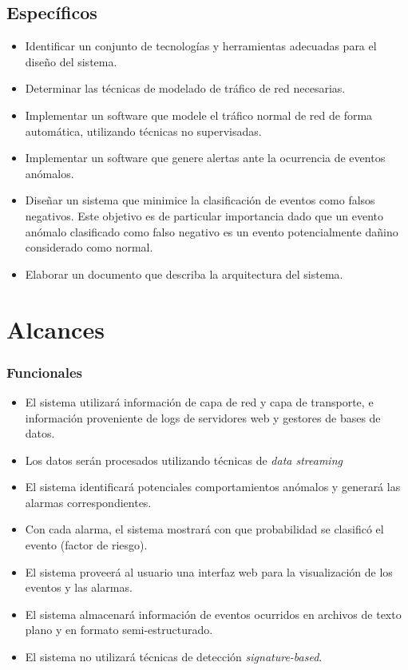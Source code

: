 \subsection*{Específicos}
\begin{itemize}

\item Identificar un conjunto de tecnologías y herramientas adecuadas para el diseño del sistema.
\item Determinar las técnicas de modelado de tráfico de red necesarias.
\item Implementar un software que modele el tráfico normal de red de forma automática, utilizando técnicas no supervisadas.
\item Implementar un software que genere alertas ante la ocurrencia de eventos anómalos.
\item Diseñar un sistema que minimice la clasificación de eventos como falsos negativos. Este objetivo es de particular importancia dado que un evento anómalo clasificado como falso negativo es un evento potencialmente dañino considerado como normal.
\item Elaborar un documento que describa la arquitectura del sistema.
\end{itemize}

\section*{Alcances}

\subsubsection*{Funcionales}
\begin{itemize}
	\item El sistema utilizará información de capa de red\cite{rfc791} y capa de transporte\cite{rfc793}\cite{rfc1180}, e información proveniente de logs de servidores web y gestores de bases de datos.
	\item Los datos serán procesados utilizando técnicas de \textit{data streaming}\cite{Fischer:2012:RVA:2245276.2245432}
	\item El sistema identificará potenciales comportamientos anómalos y generará las alarmas correspondientes.
	\item Con cada alarma, el sistema mostrará con que probabilidad se clasificó el evento (factor de riesgo).
	\item El sistema proveerá al usuario una interfaz web para la visualización de los eventos y las alarmas.
	\item El sistema almacenará información de eventos ocurridos en archivos de texto plano y en formato semi-estructurado.
	\item El sistema no utilizará técnicas de detección \textit{signature-based}.
\end{itemize}

